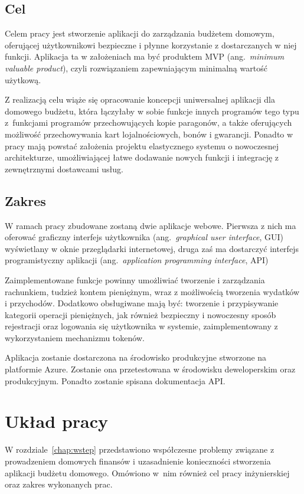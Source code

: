 \subsection{Cel}
\label{subsec:cel}
Celem pracy jest stworzenie aplikacji do zarządzania budżetem domowym, oferującej użytkownikowi bezpieczne i płynne korzystanie z dostarczanych w niej funkcji.
Aplikacja ta w założeniach ma być produktem MVP (ang.~\emph{minimum valuable product}), czyli rozwiązaniem zapewniającym minimalną wartość użytkową.  

Z realizacją celu wiąże się opracowanie koncepcji uniwersalnej aplikacji dla domowego budżetu, która łączyłaby w sobie funkcje innych programów tego typu z~funkcjami programów przechowujących kopie paragonów, a także oferujących możliwość przechowywania kart lojalnościowych, bonów i gwarancji. 
Ponadto w pracy mają powstać założenia projektu elastycznego systemu o nowoczesnej architekturze, umożliwiającej łatwe dodawanie nowych funkcji i integrację z zewnętrznymi dostawcami usług. 

\subsection{Zakres}
\label{subsec:zakres}
W ramach pracy zbudowane zostaną dwie aplikacje webowe. Pierwsza z nich ma oferować graficzny interfejs użytkownika (ang.~\emph{graphical user interface}, GUI) wyświetlany w oknie przeglądarki internetowej, druga zaś ma dostarczyć interfejs programistyczny aplikacji (ang.~\emph{application programming interface}, API)

Zaimplementowane funkcje powinny umożliwiać tworzenie i zarządzania  rachunkiem, tudzież kontem pieniężnym, wraz z możliwością tworzenia wydatków i przychodów. Dodatkowo obsługiwane mają być: tworzenie i przypisywanie kategorii operacji pieniężnych, jak również bezpieczny i nowoczesny sposób rejestracji oraz logowania się użytkownika w systemie, zaimplementowany z wykorzystaniem mechanizmu tokenów.

Aplikacja zostanie dostarczona na środowisko produkcyjne stworzone na platformie Azure. Zostanie ona przetestowana w środowisku deweloperskim oraz produkcyjnym. Ponadto zostanie spisana dokumentacja API.

\section{Układ pracy}
\label{sec:uklad-pracy}
W rozdziale~\ref{chap:wstep} przedstawiono współczesne problemy związane z prowadzeniem domowych finansów i uzasadnienie konieczności stworzenia aplikacji budżetu domowego. Omówiono w~nim również cel pracy inżynierskiej oraz zakres wykonanych prac.

